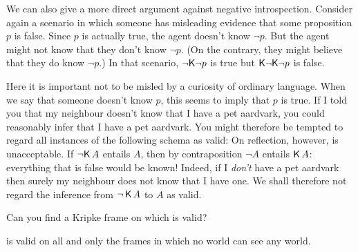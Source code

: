 We can also give a more direct argument against negative introspection. Consider
again a scenario in which someone has misleading evidence that some proposition
$p$ is false. Since $p$ is actually true, the agent doesn't know $\neg p$. But
the agent might not know that they don't know $\neg p$. (On the contrary, they
might believe that they do know $\neg p$.) In that scenario, $\neg\!\operatorname{\mathsf{K}{}}\!\neg p$ is
true but $\operatorname{\mathsf{K}{}}\!\neg\!\operatorname{\mathsf{K}{}}\!\neg p$ is false.

Here it is important not to be misled by a curiosity of ordinary language. When
we say that someone doesn't know $p$, this seems to imply that $p$ is true. If I
told you that my neighbour doesn't know that I have a pet aardvark, you could
reasonably infer that I have a pet aardvark. You might therefore be tempted to
regard all instances of the following schema as valid:
%
%
On reflection, however,  is unacceptable. If $\neg\! \operatorname{\mathsf{K}{}} A$ entails $A$,
then by contraposition $\neg A$ entails $\operatorname{\mathsf{K}{}} A$: everything that is false would
be known! Indeed, if I \emph{don't} have a pet aardvark then surely my neighbour
does not know that I have one. We shall therefore not regard the inference from
$\neg \operatorname{\mathsf{K}{}} A$ to $A$ as valid.

\begin{exercise}
  Can you find a Kripke frame on which  is valid?
\end{exercise}
\begin{solution}
   is valid on all and only the frames in which no world can see any world. 
\end{solution}

